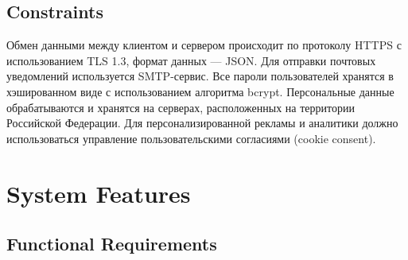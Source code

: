 \subsection{Constraints}
Обмен данными между клиентом и сервером происходит по протоколу HTTPS с
использованием TLS 1.3, формат данных — JSON. Для отправки почтовых уведомлений 
используется SMTP-сервис. Все пароли пользователей хранятся в
хэшированном виде с использованием алгоритма bcrypt. Персональные данные обрабатываются
и хранятся на серверах, расположенных на
территории Российской Федерации. Для персонализированной рекламы и аналитики
должно использоваться управление пользовательскими согласиями (cookie consent).

\section{System Features}
\subsection{Functional Requirements}
